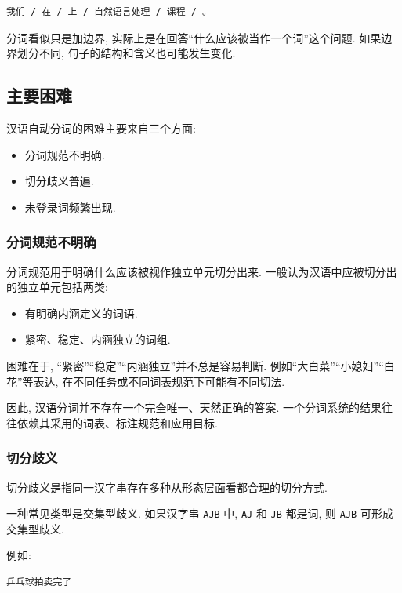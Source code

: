 \begin{Verbatim}[breaklines=true,breakanywhere=true,fontsize=\small]
我们 / 在 / 上 / 自然语言处理 / 课程 / 。
\end{Verbatim}

分词看似只是加边界, 实际上是在回答“什么应该被当作一个词”这个问题.
如果边界划分不同, 句子的结构和含义也可能发生变化.

\subsection{主要困难}


汉语自动分词的困难主要来自三个方面:

\begin{itemize}
\item 分词规范不明确.
\item 切分歧义普遍.
\item 未登录词频繁出现.
\end{itemize}

\subsubsection{分词规范不明确}


分词规范用于明确什么应该被视作独立单元切分出来.
一般认为汉语中应被切分出的独立单元包括两类:

\begin{itemize}
\item 有明确内涵定义的词语.
\item 紧密、稳定、内涵独立的词组.
\end{itemize}

困难在于, “紧密”“稳定”“内涵独立”并不总是容易判断.
例如“大白菜”“小媳妇”“白花”等表达, 在不同任务或不同词表规范下可能有不同切法.

因此, 汉语分词并不存在一个完全唯一、天然正确的答案.
一个分词系统的结果往往依赖其采用的词表、标注规范和应用目标.

\subsubsection{切分歧义}


切分歧义是指同一汉字串存在多种从形态层面看都合理的切分方式.

一种常见类型是交集型歧义.
如果汉字串 \texttt{AJB} 中, \texttt{AJ} 和 \texttt{JB} 都是词, 则 \texttt{AJB} 可形成交集型歧义.

例如:

\begin{Verbatim}[breaklines=true,breakanywhere=true,fontsize=\small]
乒乓球拍卖完了
\end{Verbatim}

